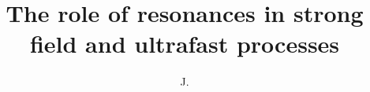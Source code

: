 \documentclass[defaultstyle,11pt]{thesis}
\title{The role of resonances in strong field and ultrafast processes}
\author{J.}{Venzke}
\begin{document}









\nocite{*}		%

% 
% 
\end{document}
